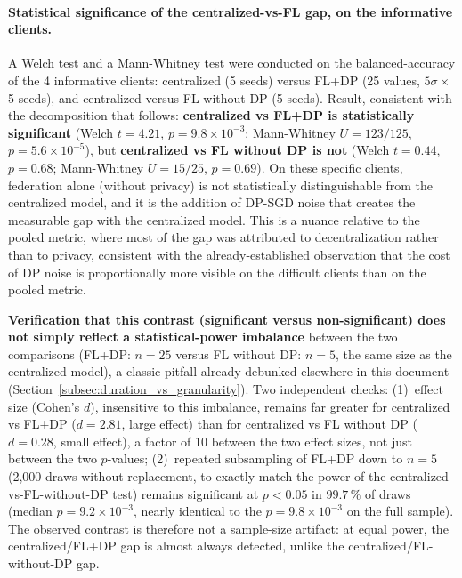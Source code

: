 \documentclass{article}
\begin{document}
\paragraph{Statistical significance of the centralized-vs-FL gap, on the
informative clients.} A Welch test and a Mann-Whitney test were conducted on the
balanced-accuracy of the 4 informative clients: centralized (5 seeds) versus
FL+DP (25 values, $5\sigma \times$ 5 seeds), and centralized versus FL without DP
(5 seeds). Result, consistent with the decomposition that follows:
\textbf{centralized vs FL+DP is statistically significant} (Welch $t=4.21$,
$p=9.8\times10^{-3}$; Mann-Whitney $U=123/125$, $p=5.6\times10^{-5}$), but
\textbf{centralized vs FL without DP is not} (Welch $t=0.44$, $p=0.68$;
Mann-Whitney $U=15/25$, $p=0.69$). On these specific clients, federation alone
(without privacy) is not statistically distinguishable from the centralized
model, and it is the addition of DP-SGD noise that creates the measurable gap
with the centralized model. This is a nuance relative to the pooled metric, where
most of the gap was attributed to decentralization rather than to privacy,
consistent with the already-established observation that the cost of DP noise is
proportionally more visible on the difficult clients than on the pooled metric.

\textbf{Verification that this contrast (significant versus non-significant)
does not simply reflect a statistical-power imbalance} between the two
comparisons (FL+DP: $n=25$ versus FL without DP: $n=5$, the same size as the
centralized model), a classic pitfall already debunked elsewhere in this document
(Section~\ref{subsec:duration_vs_granularity}). Two independent checks:
(1)~effect size (Cohen's $d$), insensitive to this imbalance, remains far
greater for centralized vs FL+DP ($d=2.81$, large effect) than for centralized vs
FL without DP ($d=0.28$, small effect), a factor of 10 between the two effect
sizes, not just between the two $p$-values; (2)~repeated subsampling of FL+DP
down to $n=5$ (2,000 draws without replacement, to exactly match the power of the
centralized-vs-FL-without-DP test) remains significant at $p<0.05$ in $99.7\,\%$
of draws (median $p =9.2\times10^{-3}$, nearly identical to the
$p=9.8\times10^{-3}$ on the full sample). The observed contrast is therefore not
a sample-size artifact: at equal power, the centralized/FL+DP gap is almost
always detected, unlike the centralized/FL-without-DP gap.
\end{document}
